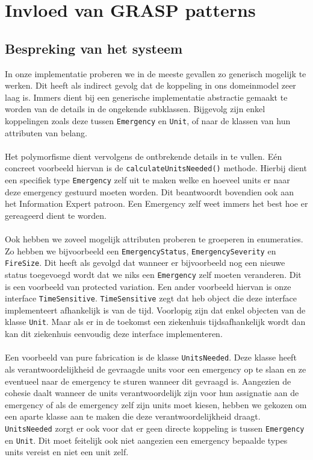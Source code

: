 \section{Invloed van GRASP patterns}
\label{grasp}
\subsection{Bespreking van het systeem}
In onze implementatie proberen we in de meeste gevallen zo generisch mogelijk te werken. Dit heeft als indirect gevolg dat de koppeling in ons domeinmodel zeer laag is. Immers dient bij een generische implementatie abstractie gemaakt te worden van de details in de ongekende subklassen. Bijgevolg zijn enkel koppelingen zoals deze tussen \verb+Emergency+ en \verb+Unit+, of naar de klassen van hun attributen van belang.
\paragraph{}
Het polymorfisme dient vervolgens de ontbrekende details in te vullen. E\'en concreet voorbeeld hiervan is de \verb+calculateUnitsNeeded()+ methode. Hierbij dient een specifiek type \verb+Emergency+ zelf uit te maken welke en hoeveel units er naar deze emergency gestuurd moeten worden. Dit beantwoordt bovendien ook aan het Information Expert patroon. Een Emergency zelf weet immers het best hoe er gereageerd dient te worden.
\paragraph{}
Ook hebben we zoveel mogelijk attributen proberen te groeperen in enumeraties. Zo hebben we bijvoorbeeld een \verb+EmergencyStatus+, \verb+EmergencySeverity+ en \verb+FireSize+. Dit heeft als gevolgd dat wanneer er bijvoorbeeld nog een nieuwe status toegevoegd wordt dat we niks een \verb+Emergency+ zelf moeten veranderen. Dit is een voorbeeld van protected variation. Een ander voorbeeld hiervan is onze interface \verb+TimeSensitive+. \verb+TimeSensitive+ zegt dat heb object die deze interface implementeert afhankelijk is van de tijd. Voorlopig zijn dat enkel objecten van de klasse \verb+Unit+. Maar als er in de toekomst een ziekenhuis tijdsafhankelijk wordt dan kan dit ziekenhuis eenvoudig deze interface implementeren.
\paragraph{}
Een voorbeeld van pure fabrication is de klasse \verb+UnitsNeeded+. Deze klasse heeft als verantwoordelijkheid de gevraagde units voor een emergency op te slaan en ze eventueel naar de emergency te sturen wanneer dit gevraagd is. Aangezien de cohesie daalt wanneer de units verantwoordelijk zijn voor hun assignatie aan de emergency of als de emergency zelf zijn units moet kiesen, hebben we gekozen om een aparte klasse aan te maken die deze verantwoordelijkheid draagt. \verb+UnitsNeeded+ zorgt er ook voor dat er geen directe koppeling is tussen \verb+Emergency+ en \verb+Unit+. Dit moet feitelijk ook niet aangezien een emergency bepaalde types units vereist en niet een unit zelf.
